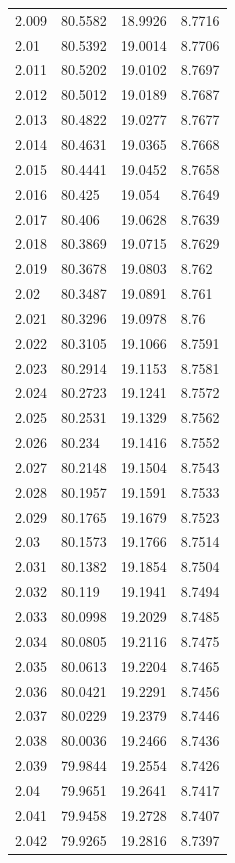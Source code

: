 \begin{tabular}{llll}
2.009 & 80.5582 & 18.9926 & 8.7716 \\
2.01 & 80.5392 & 19.0014 & 8.7706 \\
2.011 & 80.5202 & 19.0102 & 8.7697 \\
2.012 & 80.5012 & 19.0189 & 8.7687 \\
2.013 & 80.4822 & 19.0277 & 8.7677 \\
2.014 & 80.4631 & 19.0365 & 8.7668 \\
2.015 & 80.4441 & 19.0452 & 8.7658 \\
2.016 & 80.425 & 19.054 & 8.7649 \\
2.017 & 80.406 & 19.0628 & 8.7639 \\
2.018 & 80.3869 & 19.0715 & 8.7629 \\
2.019 & 80.3678 & 19.0803 & 8.762 \\
2.02 & 80.3487 & 19.0891 & 8.761 \\
2.021 & 80.3296 & 19.0978 & 8.76 \\
2.022 & 80.3105 & 19.1066 & 8.7591 \\
2.023 & 80.2914 & 19.1153 & 8.7581 \\
2.024 & 80.2723 & 19.1241 & 8.7572 \\
2.025 & 80.2531 & 19.1329 & 8.7562 \\
2.026 & 80.234 & 19.1416 & 8.7552 \\
2.027 & 80.2148 & 19.1504 & 8.7543 \\
2.028 & 80.1957 & 19.1591 & 8.7533 \\
2.029 & 80.1765 & 19.1679 & 8.7523 \\
2.03 & 80.1573 & 19.1766 & 8.7514 \\
2.031 & 80.1382 & 19.1854 & 8.7504 \\
2.032 & 80.119 & 19.1941 & 8.7494 \\
2.033 & 80.0998 & 19.2029 & 8.7485 \\
2.034 & 80.0805 & 19.2116 & 8.7475 \\
2.035 & 80.0613 & 19.2204 & 8.7465 \\
2.036 & 80.0421 & 19.2291 & 8.7456 \\
2.037 & 80.0229 & 19.2379 & 8.7446 \\
2.038 & 80.0036 & 19.2466 & 8.7436 \\
2.039 & 79.9844 & 19.2554 & 8.7426 \\
2.04 & 79.9651 & 19.2641 & 8.7417 \\
2.041 & 79.9458 & 19.2728 & 8.7407 \\
2.042 & 79.9265 & 19.2816 & 8.7397 \\

\end{tabular}
